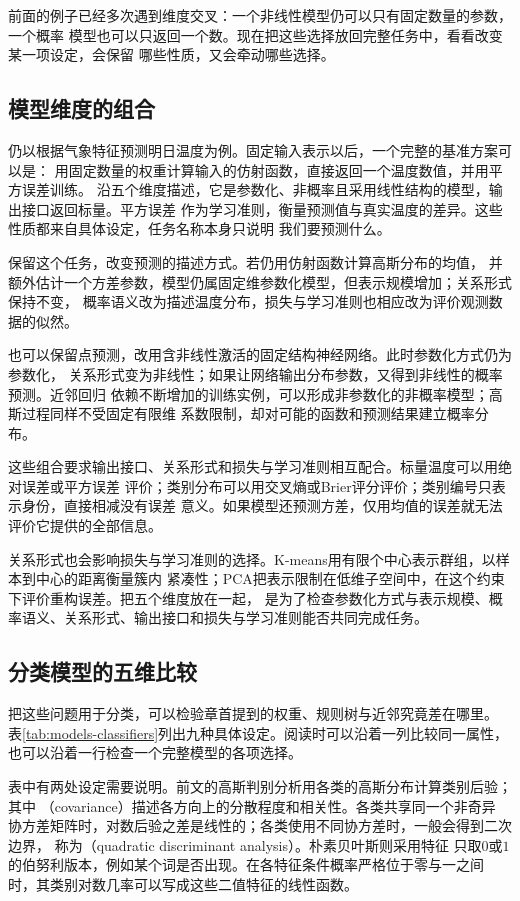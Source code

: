 前面的例子已经多次遇到维度交叉：一个非线性模型仍可以只有固定数量的参数，一个概率
模型也可以只返回一个数。现在把这些选择放回完整任务中，看看改变某一项设定，会保留
哪些性质，又会牵动哪些选择。

\subsection{模型维度的组合}
\label{sec:models-dimension-combination}

仍以根据气象特征预测明日温度为例。固定输入表示以后，一个完整的基准方案可以是：
用固定数量的权重计算输入的仿射函数，直接返回一个温度数值，并用平方误差训练。
沿五个维度描述，它是参数化、非概率且采用线性结构的模型，输出接口返回标量。平方误差
作为学习准则，衡量预测值与真实温度的差异。这些性质都来自具体设定，任务名称本身只说明
我们要预测什么。

保留这个任务，改变预测的描述方式。若仍用仿射函数计算高斯分布的均值，
并额外估计一个方差参数，模型仍属固定维参数化模型，但表示规模增加；关系形式保持不变，
概率语义改为描述温度分布，损失与学习准则也相应改为评价观测数据的似然。

也可以保留点预测，改用含非线性激活的固定结构神经网络。此时参数化方式仍为参数化，
关系形式变为非线性；如果让网络输出分布参数，又得到非线性的概率预测。近邻回归
依赖不断增加的训练实例，可以形成非参数化的非概率模型；高斯过程同样不受固定有限维
系数限制，却对可能的函数和预测结果建立概率分布。

这些组合要求输出接口、关系形式和损失与学习准则相互配合。标量温度可以用绝对误差或平方误差
评价；类别分布可以用交叉熵或Brier评分评价；类别编号只表示身份，直接相减没有误差
意义。如果模型还预测方差，仅用均值的误差就无法评价它提供的全部信息。

关系形式也会影响损失与学习准则的选择。K-means用有限个中心表示群组，以样本到中心的距离衡量簇内
紧凑性；PCA把表示限制在低维子空间中，在这个约束下评价重构误差。把五个维度放在一起，
是为了检查参数化方式与表示规模、概率语义、关系形式、输出接口和损失与学习准则能否共同完成任务。

\subsection{分类模型的五维比较}
\label{sec:models-classification-grid}

把这些问题用于分类，可以检验章首提到的权重、规则树与近邻究竟差在哪里。
表\ref{tab:models-classifiers}列出九种具体设定。阅读时可以沿着一列比较同一属性，
也可以沿着一行检查一个完整模型的各项选择。

表中有两处设定需要说明。前文的高斯判别分析用各类的高斯分布计算类别后验；其中
（covariance）描述各方向上的分散程度和相关性。各类共享同一个非奇异
协方差矩阵时，对数后验之差是线性的；各类使用不同协方差时，一般会得到二次边界，
称为（quadratic discriminant analysis）。朴素贝叶斯则采用特征
只取$0$或$1$的伯努利版本，例如某个词是否出现。在各特征条件概率严格位于零与一之间
时，其类别对数几率可以写成这些二值特征的线性函数。

